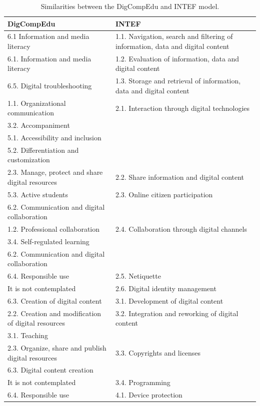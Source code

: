 \documentclass{textolivre}
\begin{document}
\begin{longtable}{
    p{}
    p{}
    }
\caption{Similarities between the DigCompEdu and INTEF model.}
\label{tab01}
\\
\toprule 
DigCompEdu                      & INTEF                  \\
\midrule
6.1 Information and media literacy  & 1.1. Navigation, search and filtering of information, data and digital content \\
6.1. Information and media literacy & 1.2. Evaluation of information, data and digital content \\
6.5. Digital troubleshooting	    & 1.3. Storage and retrieval of information, data and digital content \\
1.1. Organizational communication   & 2.1. Interaction through digital technologies \\
3.2. Accompaniment & \\
5.1. Accessibility and inclusion & \\
5.2. Differentiation and customization & \\
2.3. Manage, protect and share digital resources & 2.2. Share information and digital content \\
5.3. Active students & 2.3. Online citizen participation \\
6.2. Communication and digital collaboration & \\
1.2. Professional collaboration & 2.4. Collaboration through digital channels \\
3.4. Self-regulated learning & \\
6.2. Communication and digital collaboration & \\
6.4. Responsible use & 2.5. Netiquette \\
It is not contemplated & 2.6. Digital identity management \\
6.3. Creation of digital content & 3.1. Development of digital content \\
2.2. Creation and modification of digital resources & 3.2. Integration and reworking of digital content \\
3.1. Teaching & \\
2.3. Organize, share and publish digital resources & 3.3. Copyrights and licenses \\
6.3. Digital content creation & \\
It is not contemplated & 3.4. Programming \\
6.4. Responsible use & 4.1. Device protection \\

\end{longtable}
\end{document}
